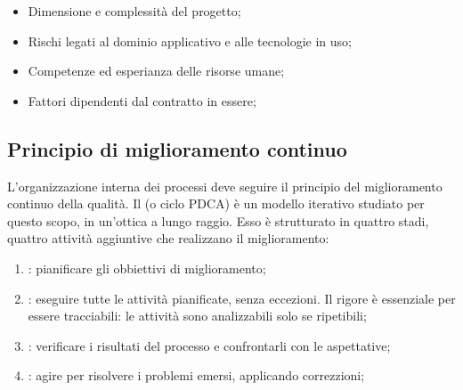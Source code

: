 \begin{itemize}
  \item Dimensione e complessità del progetto;
  \item Rischi legati al dominio applicativo e alle tecnologie in uso;
  \item Competenze ed esperianza delle risorse umane;
  \item Fattori dipendenti dal contratto in essere;
\end{itemize}

\subsection{Principio di miglioramento continuo}

L'organizzazione interna dei processi deve seguire il principio del
miglioramento continuo della qualità. Il  (o ciclo PDCA)
è un modello iterativo studiato per questo scopo, in un'ottica a lungo raggio.
Esso è strutturato in quattro stadi, quattro attività aggiuntive che realizzano
il miglioramento:

\begin{enumerate}
  \item {}: pianificare gli obbiettivi di miglioramento;
  \item {}: eseguire tutte le attività pianificate, senza
    eccezioni. Il rigore è essenziale per essere tracciabili: le attività
    sono analizzabili solo se ripetibili;
  \item {}: verificare i risultati del processo e
    confrontarli con le aspettative;
  \item {}: agire per risolvere i problemi emersi,
    applicando correzzioni;
\end{enumerate}
